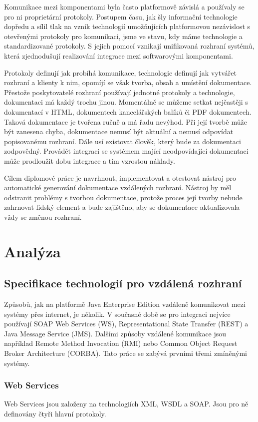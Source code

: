 \documentclass[11pt,twoside,a4paper]{book}
\begin{document}
Komunikace mezi komponentami byla často platformově závislá a používaly se pro ni
proprietární protokoly. Postupem času, jak šly informační technologie dopředu a sílil tlak na
vznik technologií umožňujících platformovou nezávislost s otevřenými protokoly pro
komunikaci, jsme ve stavu, kdy máme technologie a standardizované protokoly. S jejich
pomocí vznikají unifikovaná rozhraní systémů, která zjednodušují realizování integrace mezi
softwarovými komponentami.

Protokoly definují jak probíhá komunikace, technologie definují jak vytvářet rozhraní a
klienty k nim, opomíjí se však tvorba, obsah a umístění dokumentace. Přestože poskytovatelé
rozhraní používají jednotné protokoly a technologie, dokumentaci má každý trochu jinou.
Momentálně se můžeme setkat nejčastěji s dokumentací v HTML, dokumentech
kancelářských balíků či PDF dokumentech. Taková dokumentace je tvořena ručně a má řadu
nevýhod. Při její tvorbě může být zanesena chyba, dokumentace nemusí být aktuální a nemusí
odpovídat popisovanému rozhraní. Dále usí existovat člověk, který bude za dokumentaci
zodpovědný. Provádět integraci se systémem mající neodpovídající dokumentaci může
prodloužit dobu integrace a tím vzrostou náklady.

Cílem diplomové práce je navrhnout, implementovat a otestovat nástroj pro automatické
generování dokumentace vzdálených rozhraní. Nástroj by měl odstranit problémy s tvorbou
dokumentace, protože proces její tvorby nebude zahrnovat lidský element a bude zajištěno,
aby se dokumentace aktualizovala vždy se změnou rozhraní.

\chapter{Analýza}
\section{Specifikace technologií pro vzdálená rozhraní}
Způsobů, jak na platformě Java Enterprise Edition vzdáleně komunikovat mezi
systémy přes internet, je několik. V současné době se pro integraci nejvíce
používají SOAP Web Services (WS), Representational State Transfer (REST) a Java Message Service (JMS). Dalšími
způsoby vzdálené komunikace jsou například
Remote Method Invocation (RMI) nebo
Common Object Request Broker Architecture (CORBA). Tato práce se zabývá prvními třemi
zmíněnými systémy.


\subsection{Web Services}
Web Services jsou založeny na technologiích XML, WSDL a SOAP. Jsou pro ně
definovány čtyři hlavní protokoly.
\end{document}
